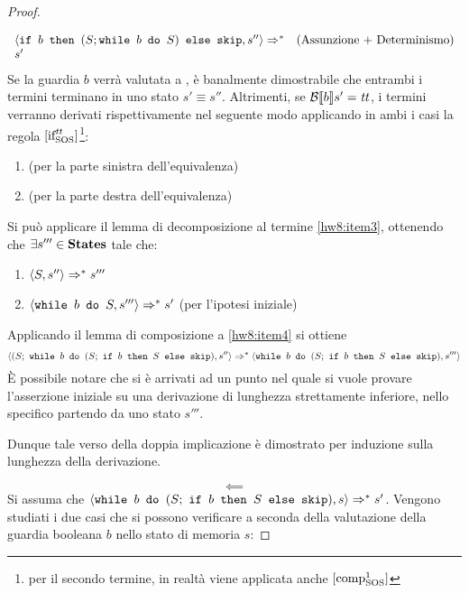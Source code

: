 \begin{proof}
\begin{itemize}
$$\begin{array}{lr}
  \langle{}\mbox{\normalfont{\texttt{if }}} b \textrm{\normalfont{\texttt{ then }}} (S;\mbox{\normalfont{\texttt{while }}} b \textrm{\normalfont{\texttt{ do }}} S) \textrm{\normalfont{\texttt{ else }}} \textrm{\normalfont{\texttt{skip}}}, s''\rangle{} \Rightarrow^{*} & (\text{Assunzione + Determinismo})\\
  s'
  \end{array}
  $$
  Se la guardia $b$ verrà valutata a \semfalse, è banalmente dimostrabile che
  entrambi i termini terminano in uno stato $s' \equiv{} s''$.
  Altrimenti, se $\mathcal{B} \llbracket b \rrbracket s' = \mbox{\textit{tt}}$, i termini verranno derivati
  rispettivamente nel seguente modo applicando in ambi i casi la regola
  $ [ \textrm{\normalfont{if}} ^ \textrm{\normalfont{\ensuremath{\mbox{\textit{tt}}}}} _\textrm{\normalfont{SOS}} ] $\footnote{per il secondo termine, in realtà viene applicata anche
  $ [ \textrm{\normalfont{comp}} ^ \textrm{\normalfont{1}} _\textrm{\normalfont{SOS}} ] $}:
  \begin{enumerate}
    \item {} (per la parte sinistra dell'equivalenza)
    \label{hw8:item3}
    \item {}
      (per la parte destra dell'equivalenza)
  \end{enumerate}
  Si può applicare il lemma di decomposizione al termine \ref{hw8:item3},
  ottenendo che $\exists{s'''} \in \mbox{\textbf{States}}$ tale che:
  \begin{enumerate}[label=(\alph*)]
    \item $\langle{}S, s''\rangle{} \Rightarrow^{*} s'''$
    \label{hw8:item4}
    \item $\langle{}\mbox{\normalfont{\texttt{while }}} b \textrm{\normalfont{\texttt{ do }}} S, s'''\rangle{} \Rightarrow^{*} s'$ (per l'ipotesi iniziale)
    \label{hw8:item5}
  \end{enumerate}
  Applicando il lemma di composizione a \ref{hw8:item4} si ottiene
  $$
  \confSs{(S;\ \wbS{b}{(S;\ \ifABC{b}{S}{\skipForFriends})}}{s''}
    \Rar{*}
  \confSs{\wbS{b}{(S;\ \ifABC{b}{S}{\skipForFriends})}}{s'''}
  $$
  È possibile notare che si è arrivati ad un punto nel quale si vuole provare
  l'asserzione iniziale su una derivazione di lunghezza strettamente inferiore,
  nello specifico partendo da uno stato $s'''$.

  Dunque tale verso della doppia implicazione è dimostrato per induzione sulla
  lunghezza della derivazione.
\end{itemize}


$$
\boxed{\impliedby}
$$
Si assuma che
$\confSs{\wbS{b}{(S;\ \ifABC{b}{S}{\skipForFriends})}}{s} \Rar{*} s'$. Vengono
studiati i due casi che si possono verificare a seconda della valutazione
della guardia booleana $b$ nello stato di memoria $s$:


\end{proof}
